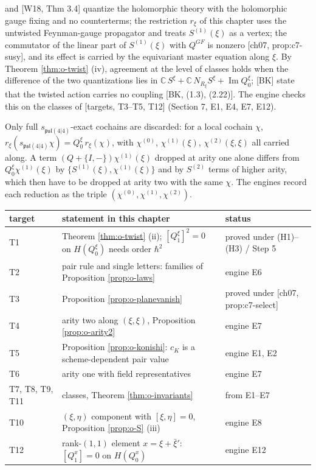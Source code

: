 \begin{remark} and [W18, Thm 3.4] quantize the holomorphic theory with the holomorphic gauge fixing and no counterterms; the restriction $r_\xi$ of this chapter uses the untwisted Feynman-gauge propagator and treats $S^{(1)}(\xi)$ as a vertex; the commutator of the linear part of $S^{(1)}(\xi)$ with $Q^{GF}$ is nonzero [ch07, prop:c7-susy], and its effect is carried by the equivariant master equation along $\xi$. By Theorem \ref{thm:o-twist} (iv), agreement at the level of classes holds when the difference of the two quantizations lies in $\mathbb C\,S^\xi+\mathbb C\,N_{R_\xi}S^\xi+\operatorname{Im}Q_0^\xi$; [BK] state that the twisted action carries no coupling [BK, (1.3), (2.22)]. The engine checks this on the classes of [targets, T3--T5, T12] (Section 7, E1, E4, E7, E12).
\end{remark}

\begin{remark}
\label{rem:o-exact}
Only full $s_{\mathfrak{psl}(4|4)}$-exact cochains are discarded: for a local cochain $\chi$, $r_\xi(s_{\mathfrak{psl}(4|4)}\chi)=Q_0^\xi\,r_\xi(\chi)$, with $\chi^{(0)}$, $\chi^{(1)}(\xi)$, $\chi^{(2)}(\xi,\xi)$ all carried along. A term $(Q+\{I,-\})\chi^{(1)}(\xi)$ dropped at arity one alone differs from $Q_0^\xi\chi^{(1)}(\xi)$ by $\{S^{(1)}(\xi),\chi^{(1)}(\xi)\}$ and by $S^{(2)}$ terms of higher arity, which then have to be dropped at arity two with the same $\chi$. The engines record each reduction as the triple $(\chi^{(0)},\chi^{(1)},\chi^{(2)})$.
\end{remark}

\begin{tabular}{l|l|l}
target & statement in this chapter & status \\
\hline
T1 & Theorem \ref{thm:o-twist} (ii); $[Q_1^\xi]^2=0$ on $H(Q_0^\xi)$ needs order $\hbar^2$ & proved under (H1)--(H3) / Step 5 \\
T2 & pair rule and single letters: families of Proposition \ref{prop:o-laws} & engine E6 \\
T3 & Proposition \ref{prop:o-planevanish} & proved under [ch07, prop:c7-select] \\
T4 & arity two along $(\xi,\xi)$, Proposition \ref{prop:o-arity2} & engine E7 \\
T5 & Proposition \ref{prop:o-konishi}: $c_K$ is a scheme-dependent pair value & engine E1, E2 \\
T6 & arity one with field representatives & engine E7 \\
T7, T8, T9, T11 & classes, Theorem \ref{thm:o-invariants} & from E1--E7 \\
T10 & $(\xi,\eta)$ component with $[\xi,\eta]=0$, Proposition \ref{prop:o-S} (iii) & engine E8 \\
T12 & rank-$(1,1)$ element $x=\xi+\bar\xi'$: $[Q_1^x]=0$ on $H(Q_0^x)$ & engine E12 \\
\end{tabular}

